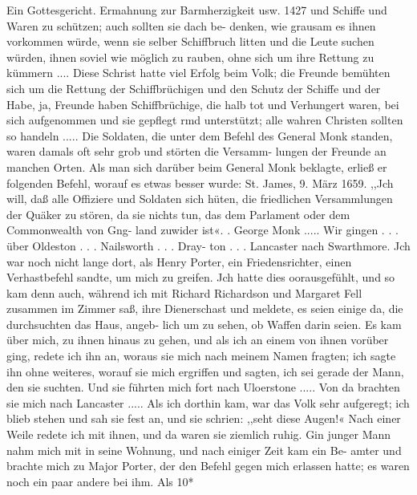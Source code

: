 Ein Gottesgericht. Ermahnung zur Barmherzigkeit usw. 1427
und Schiffe und Waren zu schützen; auch sollten sie dach be-
denken, wie grausam es ihnen vorkommen würde, wenn sie selber
Schiffbruch litten und die Leute suchen würden, ihnen soviel wie
möglich zu rauben, ohne sich um ihre Rettung zu kümmern ....
Diese Schrist hatte viel Erfolg beim Volk; die Freunde bemühten
sich um die Rettung der Schiffbrüchigen und den Schutz der
Schiffe und der Habe, ja, Freunde haben Schiffbrüchige, die halb
tot und Verhungert waren, bei sich aufgenommen und sie gepflegt
rmd unterstützt; alle wahren Christen sollten so handeln .....
Die Soldaten, die unter dem Befehl des General Monk
standen, waren damals oft sehr grob und störten die Versamm-
lungen der Freunde an manchen Orten. Als man sich darüber
beim General Monk beklagte, erließ er folgenden Befehl, worauf
es etwas besser wurde:
St. James, 9. März 1659.
,,Jch will, daß alle Offiziere und Soldaten sich hüten, die
friedlichen Versammlungen der Quäker zu stören, da sie nichts
tun, das dem Parlament oder dem Commonwealth von Gng-
land zuwider ist«. . George Monk .....
Wir gingen . . . über Oldeston . . . Nailsworth . . . Dray-
ton . . . Lancaster nach Swarthmore. Jch war noch nicht lange
dort, als Henry Porter, ein Friedensrichter, einen Verhastbefehl
sandte, um mich zu greifen. Jch hatte dies oorausgefühlt, und
so kam denn auch, während ich mit Richard Richardson und
Margaret Fell zusammen im Zimmer saß, ihre Dienerschast und
meldete, es seien einige da, die durchsuchten das Haus, angeb-
lich um zu sehen, ob Waffen darin seien. Es kam über mich, zu
ihnen hinaus zu gehen, und als ich an einem von ihnen vorüber
ging, redete ich ihn an, woraus sie mich nach meinem Namen
fragten; ich sagte ihn ohne weiteres, worauf sie mich ergriffen
und sagten, ich sei gerade der Mann, den sie suchten. Und sie
führten mich fort nach Uloerstone ..... Von da brachten sie
mich nach Lancaster ..... Als ich dorthin kam, war das Volk
sehr aufgeregt; ich blieb stehen und sah sie fest an, und sie
schrien: ,,seht diese Augen!« Nach einer Weile redete ich mit
ihnen, und da waren sie ziemlich ruhig. Gin junger Mann nahm
mich mit in seine Wohnung, und nach einiger Zeit kam ein Be-
amter und brachte mich zu Major Porter, der den Befehl gegen
mich erlassen hatte; es waren noch ein paar andere bei ihm. Als
10*


